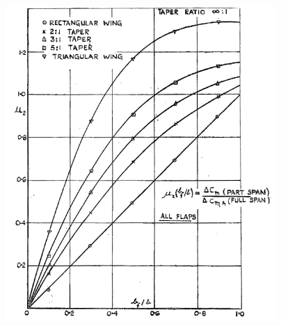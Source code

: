 \begin{figure}[H]
\centering
\begin{minipage}{.5\textwidth}
\centering
\includegraphics[width=1.1\linewidth]{Immagini/Mu2_Pitching_Moment}
\label{fig:Mu2}
\end{minipage}%
\begin{minipage}{.5\textwidth}
\centering

\end{minipage}
\end{figure}
